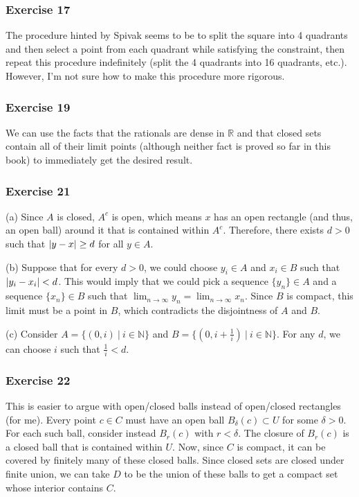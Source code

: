 \subsubsection{Exercise 17}
The procedure hinted by Spivak seems to be to split the square into 4 quadrants and then select a point from
each quadrant while satisfying the constraint, then repeat this procedure indefinitely (split the 4 quadrants
into 16 quadrants, etc.). However, I'm not sure how to make this procedure more rigorous.

\subsubsection{Exercise 19}
We can use the facts that the rationals are dense in $\mathbb{R}$ and that closed sets contain all of their
limit points (although neither fact is proved so far in this book) to immediately get the desired result.

\subsubsection{Exercise 21}
(a) Since $A$ is closed, $A^c$ is open, which means $x$ has an open rectangle (and thus, an open ball) around
it that is contained within $A^c$. Therefore, there exists $d > 0$ such that $\abs{y - x} \geq d$ for all
$y \in A$.

(b) Suppose that for every $d > 0$, we could choose $y_i \in A$ and $x_i \in B$ such that $\abs{y_i - x_i} < d$.
This would imply that we could pick a sequence $\{y_n\} \in A$ and a sequence $\{x_n\} \in B$ such that
 $\lim_{n \to \infty} y_n = \lim_{n \to \infty} x_n$. Since $B$ is compact, this limit must be a point in
  $B$, which contradicts the disjointness of  $A$ and  $B$.

(c) Consider $A = \{(0, i) \: | \: i \in \mathbb{N}\}$ and $B = \{(0, i + \frac{1}{i}) \: | \: i \in \mathbb{N}\}$.
For any $d$, we can choose $i$  such that $\frac{1}{i} < d$.

\subsubsection{Exercise 22}
This is easier to argue with open/closed balls instead of open/closed rectangles (for me). Every point
$c \in C$ must have an open ball $B_{\delta} (c) \subset U$ for some $\delta > 0$. For each such ball,
consider instead $B_{r} (c)$ with $r < \delta$. The closure of $B_r(c)$ is a closed ball that is contained
within $U$. Now, since $C$ is compact, it can be covered by finitely many of these closed balls. Since
closed sets are closed under finite union, we can take $D$ to be the union of these balls to get a compact
set whose interior contains $C$.
